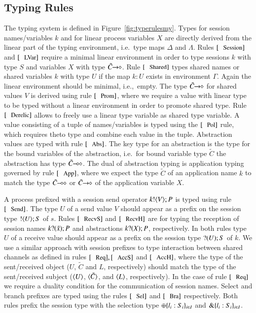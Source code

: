 \subsection{Typing Rules}
The typing system is defined in Figure~\ref{fig:typerulesmy}.
Types for session names/variables $k$ and
for linear process variables $X$ are
directly derived from the linear part of the typing
environment, i.e.~type maps $\Delta$ and $\Lambda$.
Rules $\trule{Session}$ and $\trule{LVar}$ require
a minimal linear environment in order to type
sessions $k$ with type $S$ and variables $X$ with
type $\tilde{C}\!\! \rightarrow\!\! \diamond$. Rule $\trule{Shared}$
types shared names or shared variables $k$ with
type $U$ if the map $k:U$ exists in environment
$\Gamma$. Again the linear environment should
be minimal, i.e.,~empty.
The type $\tilde{C}\!\! \rightarrow\!\! \diamond$ for shared values $V$
is derived using rule $\trule{Prom}$, where we require
a value with linear type to be typed without a linear
environment in order to promote shared type.
Rule $\trule{Derelic}$ allows to freely use a linear
type variable as shared type variable. 
A value consisting of a tuple of names/variables is typed using the $\trule{Pol}$ rule,
which requires theto type and combine each value in the tuple.
Abstraction values are typed with rule $\trule{Abs}$.
The key type for an abstraction is the type for
the bound variables of the abstraction, i.e.~for
bound variable type $\tilde{C}$ the abstraction
has type $\tilde{C}\!\! \multimap\!\! \diamond$.
The dual of abstraction typing is application typing
governed by rule $\trule{App}$, where we expect
the type $\tilde{C}$ of an application name $k$ 
to match the type $\tilde{C}\!\! \multimap\!\! \diamond$ or $\tilde{C}\!\! \rightarrow\!\! \diamond$
of the application variable $X$.

A process prefixed with a session send operator $k ! \langle V \rangle ; P$
is typed using rule $\trule{Send}$.
The type $U$ of a send value $V$ should appear as a prefix
on the session type $! \langle U \rangle ; S$ of $s$.
Rules $\trule{RecvS}$ and $\trule{RecvH}$ 
are for typing the 
reception of  session names $k ? (\tilde{x}) ; P$
and abstractions $k ? (X) ; P$, respectively.
In both rules type $U$ of a receive value should 
appear as a prefix on the session type $? (U) ; S$ of $k$.
We use a similar approach with session prefixes
to type interaction between shared channels as defined 
in rules $\trule{Req}, \trule{AccS}$ and $\trule{AccH}$,
where the type of the sent/received object 
($U$, $\tilde{C}$ and $L$, respectively) should
match the type of the sent/received subject
($\langle U \rangle$, $\langle \tilde{C} \rangle$, and $\langle L \rangle$, respectively).
In the case of rule $\trule{Req}$ we require
a duality condition for the communication of session names.
Select and branch prefixes are typed using the rules
$\trule{Sel}$ and $\trule{Bra}$ respectively. Both
rules prefix the session type with the selection
type $\oplus \{l_i: S_i\}_{i \in I}$ and
$\& \{l_i:S_i\}_{i \in I}$.

